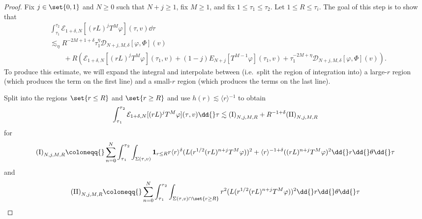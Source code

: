 \documentclass[10pt, reqno]{amsart}
\begin{document}
\begin{proof}
 Fix \(j\in \set{0,1}\) and \(N\ge 0\) such that
\(N + j\ge 1\), fix \(M\ge 1\), and fix \(1\le \tau_1\le \tau_2\). Let \(1\le R\le \tau{}_i\). The
goal of this step is to show that
\begin{equation}\label{eda-step-3-goal}
\begin{split}
&\int_{\tau{}_1}^{\tau{}_2} \mathcal{E}_{1+\delta{},N}[(rL)^jT^M\varphi{}](\tau{},v)\dd{}\tau{}\\
&\lesssim_\eta{} R^{-2M+1+\delta{}}\tau{}_1^\eta{}\mathcal{D}_{N+j,M,\delta{}}[\varphi{},\Phi{}](v) \\
&\qquad + R(\mathcal{E}_{1+\delta{},N}[(rL)^jT^M\varphi{}](\tau{}_1,v) + (1-j)E_{N+j}[T^{M-1}\varphi{}](\tau{}_1,v) + \tau{}_1^{-2M+\eta{}}\mathcal{D}_{N+j,M,\delta{}}[\varphi{},\Phi{}](v)).
\end{split}
\end{equation}
To produce this estimate, we will expand the integral and interpolate between
(i.e.~split the region of integration into) a large-\(r\) region (which produces
the term on the first line) and a small-\(r\) region (which produces the terms
on the last line).

Split into the regions \(\set{r\le R}\) and \(\set{r\ge R}\) and use
\(h(r)\lesssim \langle{}r\rangle{}^{-1}\) to obtain
\begin{equation}\label{eda-3-initial}
\int_{\tau{}_1}^{\tau{}_2} \mathcal{E}_{1+\delta{},N}[(rL)^jT^M\varphi{}](\tau{},v)\dd{}\tau{}\lesssim \textnormal{(I)}_{N,j,M,R} + R^{-1+\delta{}}\textnormal{(II)}_{N,j,M,R}
\end{equation}
for
\begin{equation}
\begin{split}
\textnormal{(I)}_{N,j,M,R}&\coloneqq{}\sum_{n=0}^N\int_{\tau{}_1}^{\tau{}_2}\int _{\Sigma{}(\tau{},v)} \mathbf{1}_{r\le R}r\langle{}r\rangle^\delta{}(L(r^{1/2}(rL)^{n+j}T^M\varphi{}))^2 + \langle{}r\rangle{}^{-1+\delta{}}((rL)^{n+j}T^{M}\varphi{})^2\dd{}r\dd{}\theta{}\dd{}\tau{} \\
\end{split}
\end{equation}
and
\begin{equation}
\textnormal{(II)}_{N,j,M,R}\coloneqq{}\sum_{n=0}^N  \int_{\tau{}_1}^{\tau{}_2}\int _{\Sigma{}(\tau{},v)\cap \set{r\ge R}} r^2(L(r^{1/2}(rL)^{n+j}T^M\varphi{}))^2\dd{}r\dd{}\theta{}\dd{}\tau{} \\
\end{equation}


\end{proof}
\end{document}
